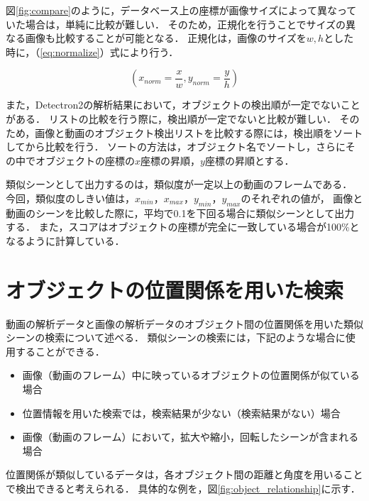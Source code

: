 \documentclass[a4j,12pt,dvipdfmx]{jreport}
\begin{document}
図\ref{fig:compare}のように，データベース上の座標が画像サイズによって異なっていた場合は，単純に比較が難しい．
そのため，正規化を行うことでサイズの異なる画像も比較することが可能となる．
正規化は，画像のサイズを$w,h$とした時に，（\ref{eq:normalize}）式により行う．

\begin{equation}
  \label{eq:normalize}
  (x_{norm} = \frac{x}{w}, y_{norm} = \frac{y}{h})
\end{equation}

また，Detectron2の解析結果において，オブジェクトの検出順が一定でないことがある．
リストの比較を行う際に，検出順が一定でないと比較が難しい．
そのため，画像と動画のオブジェクト検出リストを比較する際には，検出順をソートしてから比較を行う．
ソートの方法は，オブジェクト名でソートし，さらにその中でオブジェクトの座標の$x$座標の昇順，$y$座標の昇順とする．

類似シーンとして出力するのは，類似度が一定以上の動画のフレームである．
今回，類似度のしきい値は，$x_{min}$，$x_{max}$，$y_{min}$，$y_{max}$のそれぞれの値が，
画像と動画のシーンを比較した際に，平均で0.1を下回る場合に類似シーンとして出力する．
また，スコアはオブジェクトの座標が完全に一致している場合が100\%となるように計算している．


\section{オブジェクトの位置関係を用いた検索}\label{chap3-5}
\label{sec:search_relationship}
動画の解析データと画像の解析データのオブジェクト間の位置関係を用いた類似シーンの検索について述べる．
類似シーンの検索には，下記のような場合に使用することができる．

\begin{itemize}
  \item 画像（動画のフレーム）中に映っているオブジェクトの位置関係が似ている場合
  \item 位置情報を用いた検索では，検索結果が少ない（検索結果がない）場合
  \item 画像（動画のフレーム）において，拡大や縮小，回転したシーンが含まれる場合
\end{itemize}


位置関係が類似しているデータは，各オブジェクト間の距離と角度を用いることで検出できると考えられる．
具体的な例を，図\ref{fig:object_relationship}に示す．
\end{document}
